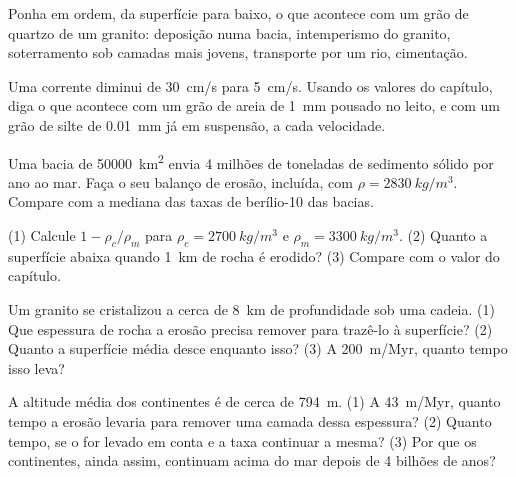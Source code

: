 \begin{exercise}[$\star$]\label{exo:g12:destruction-of-mountains:5}
Ponha em ordem, da superfície para baixo, o que acontece com um grão de
quartzo de um granito: deposição numa bacia, intemperismo do granito,
soterramento sob camadas mais jovens, transporte por um rio, cimentação.
\end{exercise}

\begin{exercise}[$\star\star$]\label{exo:g12:destruction-of-mountains:6}
Uma corrente diminui de \qty{30}{cm/s} para \qty{5}{cm/s}. Usando os valores
do capítulo, diga o que acontece com um grão de areia de \qty{1}{mm} pousado
no leito, e com um grão de silte de \qty{0.01}{mm} já em suspensão, a cada
velocidade.
\end{exercise}

\begin{exercise}[$\star\star$]\label{exo:g12:destruction-of-mountains:7}
Uma bacia de \qty{50000}{km^2} envia 4 milhões de toneladas de sedimento
sólido por ano ao mar. Faça o seu balanço de erosão, 
incluída, com $\rho =
\qty{2830}{kg/m^3}$. Compare com a mediana das taxas de berílio-10 das
bacias.
\end{exercise}

\begin{exercise}[$\star\star$]\label{exo:g12:destruction-of-mountains:8}
(1) Calcule $1 - \rho_c/\rho_m$ para $\rho_c = \qty{2700}{kg/m^3}$ e
$\rho_m = \qty{3300}{kg/m^3}$. (2) Quanto a superfície abaixa quando
\qty{1}{km} de rocha é erodido? (3) Compare com o valor do capítulo.
\end{exercise}

\begin{exercise}[$\star\star$]\label{exo:g12:destruction-of-mountains:9}
Um granito se cristalizou a cerca de \qty{8}{km} de profundidade sob uma
cadeia. (1) Que espessura de rocha a erosão precisa remover para trazê-lo à
superfície? (2) Quanto a superfície média desce enquanto isso? (3) A
\qty{200}{m/Myr}, quanto tempo isso leva?
\end{exercise}

\begin{exercise}[$\star\star$]\label{exo:g12:destruction-of-mountains:10}
A altitude média dos continentes é de cerca de \qty{794}{m}. (1) A
\qty{43}{m/Myr}, quanto tempo a erosão levaria para remover uma camada dessa
espessura? (2) Quanto tempo, se o  for levado em conta e a
taxa continuar a mesma? (3) Por que os continentes, ainda assim, continuam
acima do mar depois de 4 bilhões de anos?
\end{exercise}

